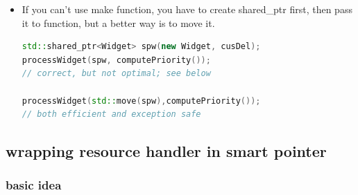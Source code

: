 \documentclass[a4paper,11pt,twoside]{book}
\begin{document}
\begin{itemize}
	\item If you can't use make function, you have to create shared\_ptr first, then pass it to function, but a better way is to move it.
\begin{lstlisting}[frame=single, language=c++]
std::shared_ptr<Widget> spw(new Widget, cusDel);
processWidget(spw, computePriority()); 
// correct, but not optimal; see below

processWidget(std::move(spw),computePriority());  
// both efficient and exception safe
\end{lstlisting}
	
\end{itemize}

\subsection{wrapping resource handler in smart pointer}

\subsubsection{basic idea}
\end{document}
